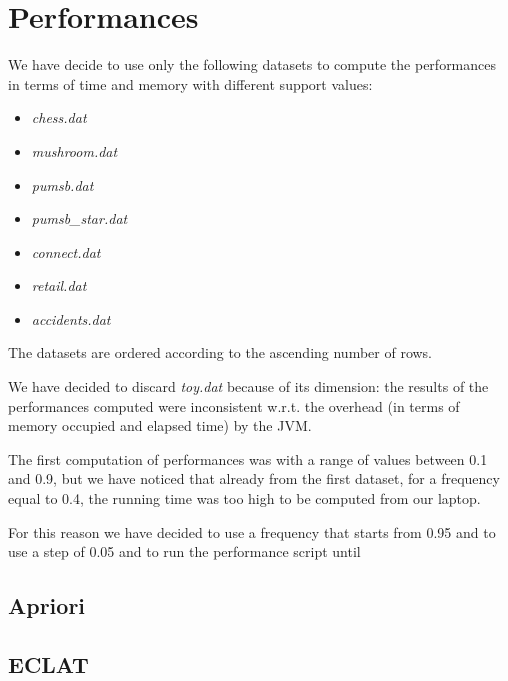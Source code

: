 \documentclass[11pt, a4paper]{article}
\begin{document}
	\section{Performances}
		We have decide to use only the following datasets to compute the performances in terms of time and memory with different support values:
		\begin{itemize}
			\item \textit{chess.dat}
			\item \textit{mushroom.dat}
			\item \textit{pumsb.dat}
			\item \textit{pumsb\_star.dat}
			\item \textit{connect.dat}
			\item \textit{retail.dat}
			\item \textit{accidents.dat}
		\end{itemize}
		The datasets are ordered according to the ascending number of rows.
		
		We have decided to discard \textit{toy.dat} because of its dimension: the results of the performances computed were inconsistent w.r.t. the overhead (in terms of memory occupied and elapsed time) by the JVM.
		\newline
		
		The first computation of performances was with a range of values between 0.1 and 0.9, but we have noticed that already from the first dataset, for a frequency equal to 0.4, the running time was too high to be computed from our laptop.
		
		For this reason we have decided to use a frequency that starts from 0.95 and to use a step of 0.05 and to run the performance script until 
		 
		\subsection{Apriori}
		\subsection{ECLAT}
			
		
\end{document}
